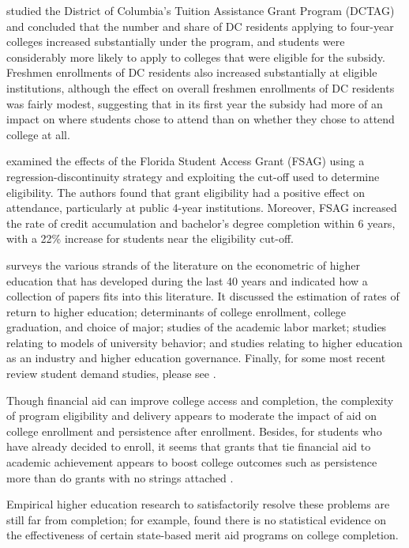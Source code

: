 \documentclass[12pt,english]{report}
\begin{document}
\citet{Abraham2006} studied the District of Columbia's Tuition Assistance Grant
Program (DCTAG) and concluded that the number and share of DC residents
applying to four-year colleges increased substantially under the program, and
students were considerably more likely to apply to colleges that were eligible
for the subsidy. Freshmen enrollments of DC residents also increased
substantially at eligible institutions, although the effect on overall freshmen
enrollments of DC residents was fairly modest, suggesting that in its first
year the subsidy had more of an impact on where students chose to attend than
on whether they chose to attend college at all.

\citet{Castleman2016} examined the effects of the Florida Student Access Grant
(FSAG) using a regression-discontinuity strategy and exploiting the cut-off
used to determine eligibility. The authors found that grant eligibility had a
positive effect on attendance, particularly at public 4-year institutions.
Moreover, FSAG increased the rate of credit accumulation and bachelor’s degree
completion within 6 years, with a 22\% increase for students near the
eligibility cut-off.

\citet{Ehrenberg2004} surveys the various strands of the literature on the
econometric of higher education that has developed during the last 40 years
and indicated how a collection of papers fits into this literature. It
discussed the estimation of rates of return to higher education; determinants
of college enrollment, college graduation, and choice of major; studies of the
academic labor market; studies relating to models of university behavior; and
studies relating to higher education as an industry and higher education
governance.  Finally, for some most recent review student demand studies,
please see \citep{Dynarski2002, Dynarski2003, Dynarski2000, Dynarski2013}.

Though financial aid can improve college access and completion, the complexity
of program eligibility and delivery appears to moderate the impact of aid on
college enrollment and persistence after enrollment. Besides, for students who
have already decided to enroll, it seems that grants that tie financial aid to
academic achievement appears to boost college outcomes such as persistence more
than do grants with no strings attached \citep{Dynarski2013}.

Empirical higher education research  to satisfactorily resolve these problems
are still far from completion; for example, \citet{Winters2015} found there is
no statistical evidence on the effectiveness of certain state-based merit aid
programs on college completion.
\end{document}
